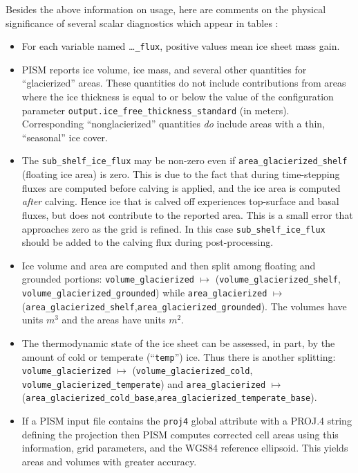 Besides the above information on usage, here are comments on the physical significance of several scalar diagnostics which appear in tables \alltsvars:
\begin{itemize}
  \item For each variable named \dots\texttt{_flux}, positive values mean ice sheet mass gain.
  \item PISM reports ice volume, ice mass, and several other quantities for ``glacierized'' areas. These quantities do not include contributions from areas where the ice thickness is equal to or below the value of the configuration parameter \texttt{output.ice_free_thickness_standard} (in meters). Corresponding ``nonglacierized'' quantities \emph{do} include areas with a thin, ``seasonal'' ice cover.
  \item The \texttt{sub_shelf_ice_flux} may be non-zero even if \texttt{area_glacierized_shelf} (floating ice area) is zero. This is due to the fact that during time-stepping fluxes are computed before calving is applied, and the ice area is computed \emph{after} calving. Hence ice that is calved off experiences top-surface and basal fluxes, but does not contribute to the reported area. This is a small error that approaches zero as the grid is refined. In this case \texttt{sub_shelf_ice_flux} should be added to the calving flux during post-processing.
  \item Ice volume and area are computed and then split among floating and grounded portions: \texttt{volume_glacierized} $\mapsto$ (\texttt{volume_glacierized_shelf}, \texttt{volume_glacierized_grounded}) while \texttt{area_glacierized} $\mapsto$ (\texttt{area_glacierized_shelf},\texttt{area_glacierized_grounded}).  The volumes have units \textsl{$m^3$} and the areas have units \textsl{$m^2$}.
  \item The thermodynamic state of the ice sheet can be assessed, in part, by the amount of cold or temperate (``\texttt{temp}'') ice.  Thus there is another splitting: \texttt{volume_glacierized} $\mapsto$ (\texttt{volume_glacierized_cold}, \texttt{volume_glacierized_temperate}) and \texttt{area_glacierized} $\mapsto$ (\texttt{area_glacierized_cold_base},\texttt{area_glacierized_temperate_base}).
  \item If a PISM input file contains the \texttt{proj4} global attribute with a PROJ.4 string defining the projection then PISM computes corrected cell areas
using this information, grid parameters, and the WGS84 reference ellipsoid. This yields areas and volumes with greater accuracy.

\end{itemize}

